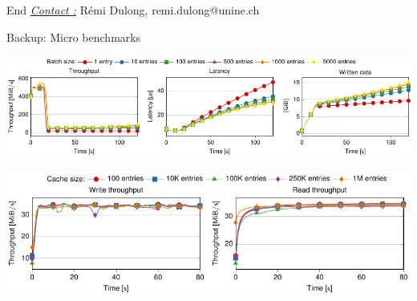 \documentclass[presentation]{beamer}
\begin{document}
\begin{frame}[label={sec:org70d93e8}]{End}
\uline{\emph{Contact :}} Rémi Dulong, remi.dulong@unine.ch\\
\end{frame}

\begin{frame}[label={sec:org0e6333c}]{Backup: Micro benchmarks}
\begin{center}
\includegraphics[width=.9\linewidth]{./IMGs/paper-figure3.pdf}
\end{center}

\begin{center}
\includegraphics[width=.9\linewidth]{./IMGs/paper-figure4.pdf}
\end{center}
\end{frame}
\end{document}
